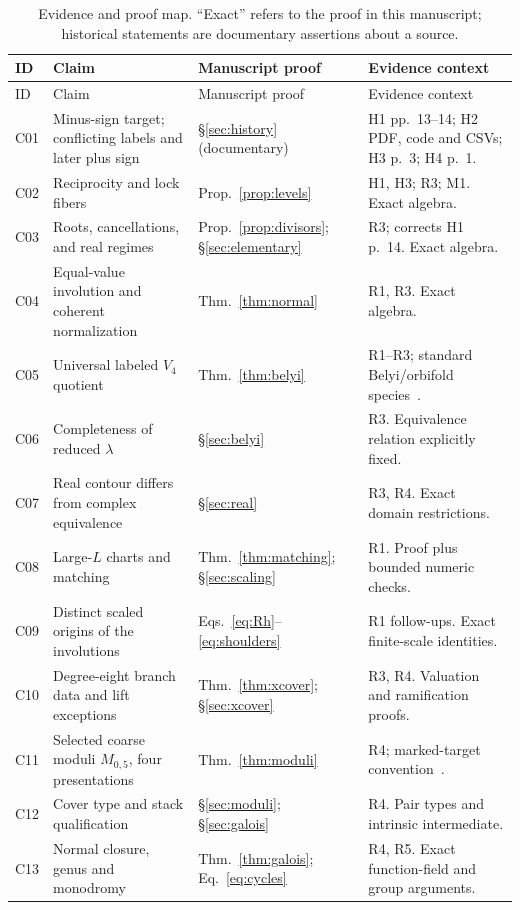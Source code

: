\begin{longtable}{L{13mm}L{48mm}L{39mm}L{45mm}}
\caption{Evidence and proof map. ``Exact'' refers to the proof in this manuscript; historical statements are documentary assertions about a source.}\label{tab:ledger}\\
\toprule ID & Claim & Manuscript proof & Evidence context\\\midrule\endfirsthead
\toprule ID & Claim & Manuscript proof & Evidence context\\\midrule\endhead
C01 & Minus-sign target; conflicting labels and later plus sign & \S\ref{sec:history} (documentary) & H1 pp.~13--14; H2 PDF, code and CSVs; H3 p.~3; H4 p.~1.\\
C02 & Reciprocity and lock fibers & Prop.~\ref{prop:levels} & H1, H3; R3; M1. Exact algebra.\\
C03 & Roots, cancellations, and real regimes & Prop.~\ref{prop:divisors}; \S\ref{sec:elementary} & R3; corrects H1 p.~14. Exact algebra.\\
C04 & Equal-value involution and coherent normalization & Thm.~\ref{thm:normal} & R1, R3. Exact algebra.\\
C05 & Universal labeled \(V_4\) quotient & Thm.~\ref{thm:belyi} & R1--R3; standard Belyi/orbifold species~\cite{SV,KO}.\\
C06 & Completeness of reduced \(\lambda\) & \S\ref{sec:belyi} & R3. Equivalence relation explicitly fixed.\\
C07 & Real contour differs from complex equivalence & \S\ref{sec:real} & R3, R4. Exact domain restrictions.\\
C08 & Large-\(L\) charts and matching & Thm.~\ref{thm:matching}; \S\ref{sec:scaling} & R1. Proof plus bounded numeric checks.\\
C09 & Distinct scaled origins of the involutions & Eqs.~\eqref{eq:Rh}--\eqref{eq:shoulders} & R1 follow-ups. Exact finite-scale identities.\\
C10 & Degree-eight branch data and lift exceptions & Thm.~\ref{thm:xcover}; \S\ref{sec:xcover} & R3, R4. Valuation and ramification proofs.\\
C11 & Selected coarse moduli \(M_{0,5}\), four presentations & Thm.~\ref{thm:moduli} & R4; marked-target convention~\cite{Mnev}.\\
C12 & Cover type and stack qualification & \S\ref{sec:moduli}; \S\ref{sec:galois} & R4. Pair types and intrinsic intermediate.\\
C13 & Normal closure, genus and monodromy & Thm.~\ref{thm:galois}; Eq.~\eqref{eq:cycles} & R4, R5. Exact function-field and group arguments.\\

\end{longtable}

